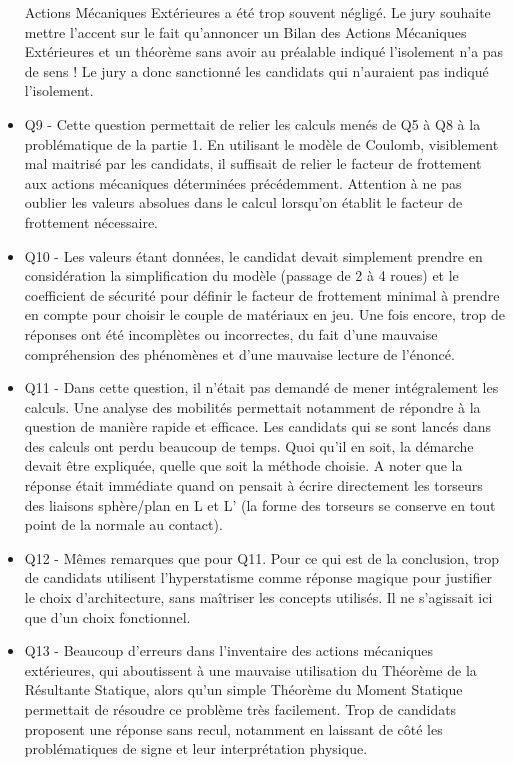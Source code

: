 \documentclass[10pt,fleqn]{article} %
\begin{document}
\begin{itemize}
Actions Mécaniques Extérieures a été trop souvent négligé. Le jury souhaite mettre l’accent sur le
fait qu’annoncer un Bilan des Actions Mécaniques Extérieures et un théorème sans avoir au préalable
indiqué l’isolement n’a pas de sens ! Le jury a donc sanctionné les candidats qui n’auraient pas indiqué
l’isolement.
\item Q9 - Cette question permettait de relier les calculs menés de Q5 à Q8 à la problématique de la partie
1. En utilisant le modèle de Coulomb, visiblement mal maitrisé par les candidats, il suffisait de relier le
facteur de frottement aux actions mécaniques déterminées précédemment. Attention à ne pas oublier
les valeurs absolues dans le calcul lorsqu’on établit le facteur de frottement nécessaire.
\item Q10 - Les valeurs étant données, le candidat devait simplement prendre en considération la simplification
du modèle (passage de 2 à 4 roues) et le coefficient de sécurité pour définir le facteur de frottement
minimal à prendre en compte pour choisir le couple de matériaux en jeu. Une fois encore, trop de
réponses ont été incomplètes ou incorrectes, du fait d’une mauvaise compréhension des phénomènes et
d’une mauvaise lecture de l’énoncé.
\item  Q11 - Dans cette question, il n’était pas
demandé de mener intégralement les calculs. Une analyse des mobilités permettait notamment de
répondre à la question de manière rapide et efficace. Les candidats qui se sont lancés dans des calculs
ont perdu beaucoup de temps. Quoi qu’il en soit, la démarche devait être expliquée, quelle que soit
la méthode choisie. A noter que la réponse était immédiate quand on pensait à écrire directement
les torseurs des liaisons sphère/plan en L et L’ (la forme des torseurs se conserve en tout point de la
normale au contact).
\item Q12 - Mêmes remarques que pour Q11. Pour ce qui est de la conclusion, trop de candidats utilisent
l’hyperstatisme comme réponse magique pour justifier le choix d’architecture, sans maîtriser les concepts
utilisés. Il ne s’agissait ici que d’un choix fonctionnel.
\item Q13 - Beaucoup d’erreurs dans l’inventaire des actions mécaniques extérieures, qui aboutissent à une
mauvaise utilisation du Théorème de la Résultante Statique, alors qu’un simple Théorème du Moment
Statique permettait de résoudre ce problème très facilement. Trop de candidats proposent une réponse
sans recul, notamment en laissant de côté les problématiques de signe et leur interprétation physique.

\end{itemize}
\end{document}
